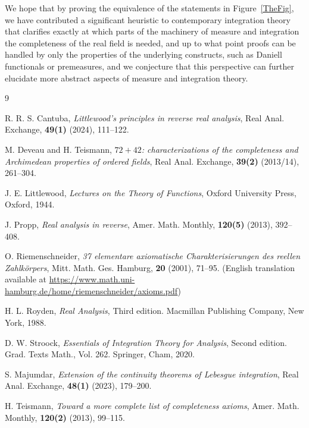 \documentclass[11pt,a4paper]{article}
\begin{document}
We hope that by proving the equivalence of the statements in Figure~\ref{TheFig}, we have contributed a significant heuristic to contemporary integration theory that clarifies exactly at which parts of the machinery of measure and integration the completeness of the real field is needed, and up to what point proofs can be handled by only the properties of the underlying constructs, such as Daniell functionals or premeasures, and we conjecture that this perspective can further elucidate more abstract aspects of measure and integration theory.

\begin{thebibliography}{9}

R. R. S. Cantuba, \textit{Littlewood's principles in reverse real analysis}, Real Anal. Exchange, \textbf{49(1)} (2024), 111--122.

M. Deveau and H. Teismann, \textit{$72+42$: characterizations of the completeness and Archimedean properties of ordered fields}, Real Anal. Exchange, \textbf{39(2)} (2013/14), 261--304.


J. E. Littlewood, \textit{Lectures on the Theory of Functions}, Oxford University Press, Oxford, 1944.

J. Propp, \textit{Real analysis in reverse}, Amer. Math. Monthly, \textbf{120(5)} (2013), 392--408.

O. Riemenschneider, \textit{37 elementare axiomatische Charakterisierungen des reellen Zahlk\"orpers}, Mitt. Math. Ges. Hamburg, \textbf{20} (2001), 71--95. (English translation available at \url{https://www.math.uni-hamburg.de/home/riemenschneider/axioms.pdf})

H. L. Royden, \textit{Real Analysis}, Third edition. Macmillan Publishing Company, New York, 1988.

D. W. Stroock, \textit{Essentials of Integration Theory for Analysis}, Second edition. Grad. Texts Math., Vol. 262. Springer, Cham, 2020.

S. Majumdar, \textit{Extension of the continuity theorems of Lebesgue integration}, Real Anal. Exchange, \textbf{48(1)} (2023), 179--200.

H. Teismann, \textit{Toward a more complete list of completeness axioms}, Amer. Math. Monthly, \textbf{120(2)} (2013), 99--115.

\end{thebibliography}
\end{document}
